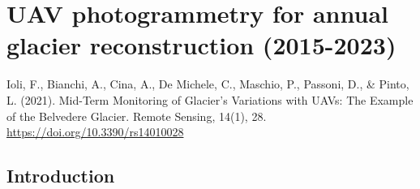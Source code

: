 \graphicspath{{figures/chapter3/}}

\chapter{UAV photogrammetry for annual glacier reconstruction (2015-2023)}\label{ch:3}

\vfill


\noindent Ioli, F., Bianchi, A., Cina, A., De Michele, C., Maschio, P., Passoni, D., \&
Pinto, L. (2021). Mid-Term Monitoring of Glacier’s Variations with UAVs: The Example of
the Belvedere Glacier. Remote Sensing, 14(1), 28.
\url{https://doi.org/10.3390/rs14010028}

\newpage

\section{Introduction}






